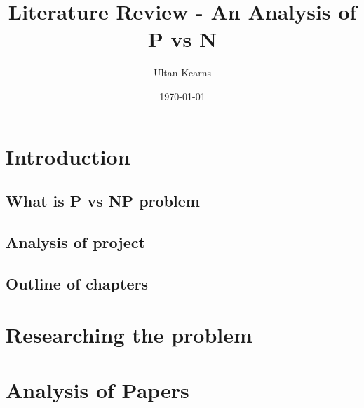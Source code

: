 \documentclass{report}
\title{Literature Review - An Analysis of P vs N}
\author{Ultan Kearns}
\date{\today}
\begin{document}
\maketitle
\tableofcontents
\chapter{Introduction}
\section{What is P vs NP problem}
\section{Analysis of project}
\section{Outline of chapters}
\chapter{Researching the problem}

\chapter{Analysis of Papers}


\end{document}
